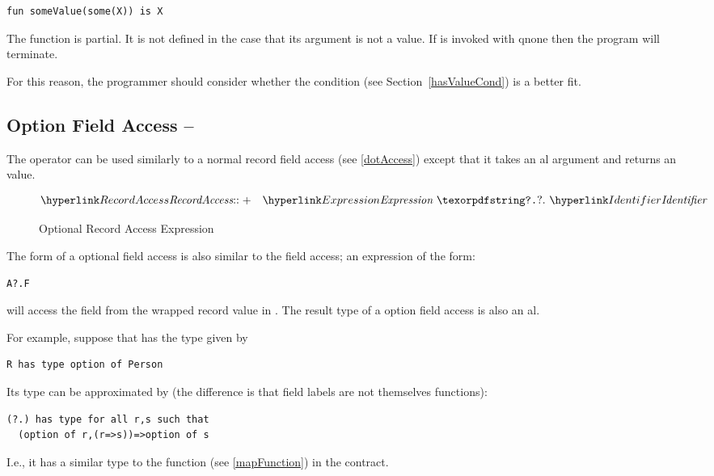 \begin{lstlisting}
fun someValue(some(X)) is X
\end{lstlisting}

\begin{aside}
\begin{aside}
The  function is partial. It is not defined in the case that its argument is not a  value. If  is invoked with q{none} then the program will terminate.

For this reason, the programmer should consider whether the  condition (see Section~\vref{hasValueCond}) is a better fit.
\end{aside}
\end{aside}

\subsection{Option Field Access -- }
\label{optionChaining}

The  operator can be used similarly to a normal record field access (see \vref{dotAccess}) except that it takes an al argument and returns an  value. 

\begin{figure}[htbp]
\begin{eqnarray*}
\ntRef{RecordAccess}&\arrowplus&\ntRef{Expression}\ \q{?.}\ \ntRef{Identifier}
\end{eqnarray*}
\caption{Optional Record Access Expression}\label{optionAccessFig}
\end{figure}

The form of a optional field access is also similar to the field access; an expression of the form:
\begin{lstlisting}
A?.F
\end{lstlisting}
will access the  field from the wrapped record value in . The result type of a option field access is also an al.

For example, suppose that  has the type given by
\begin{lstlisting}
R has type option of Person
\end{lstlisting}

Its type can be approximated by (the difference is that field labels are not themselves functions):
\begin{lstlisting}
(?.) has type for all r,s such that 
  (option of r,(r=>s))=>option of s
\end{lstlisting}
I.e., it has a similar type to the  function (see \vref{mapFunction}) in the  contract.

